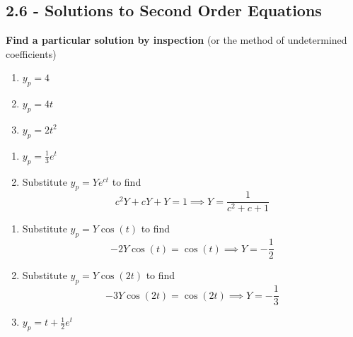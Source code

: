\documentclass[a4paper]{article}
\begin{document}
\newpage
\subsection{\textsf{2.6 - Solutions to Second Order Equations}}

\textbf{Find a particular solution by inspection} (or the method of undetermined coefficients)

\vspace{12pt}


\begin{enumerate}[label=(\alph*)]
	\item \( y_{p } = 4 \)
	\item \( y_{p } = 4t \)
	\item \( y_{p } = 2t^{2} \)
\end{enumerate}


\begin{enumerate}[label=(\alph*)]
	\item \( y_{p } = \frac{1}{3}e^{t } \)
	\item Substitute \( y_{p } = Ye^{ct } \) to find
	\[
	      c^{2}Y + cY + Y = 1 \implies Y = \frac{1}{c^{2} + c + 1}
	\]
\end{enumerate}


\begin{enumerate}[label=(\alph*)]
	\item Substitute \( y_{p } = Y\cos\!\left(t \right)  \) to find
	\[
		 -2Y \cos\!\left(t \right) = \cos\!\left(t \right) \implies Y = -\frac{1}{2}
	\]
	\item Substitute \( y_{p } = Y \cos\!\left(2t\right)  \) to find
	\[
		-3Y \cos\!\left(2t\right)  = \cos\!\left(2t\right) \implies Y = -\frac{1}{3}
	\]
	\item \( y_{p } = t + \frac{1}{2}e^{t} \)
\end{enumerate}
\end{document}
